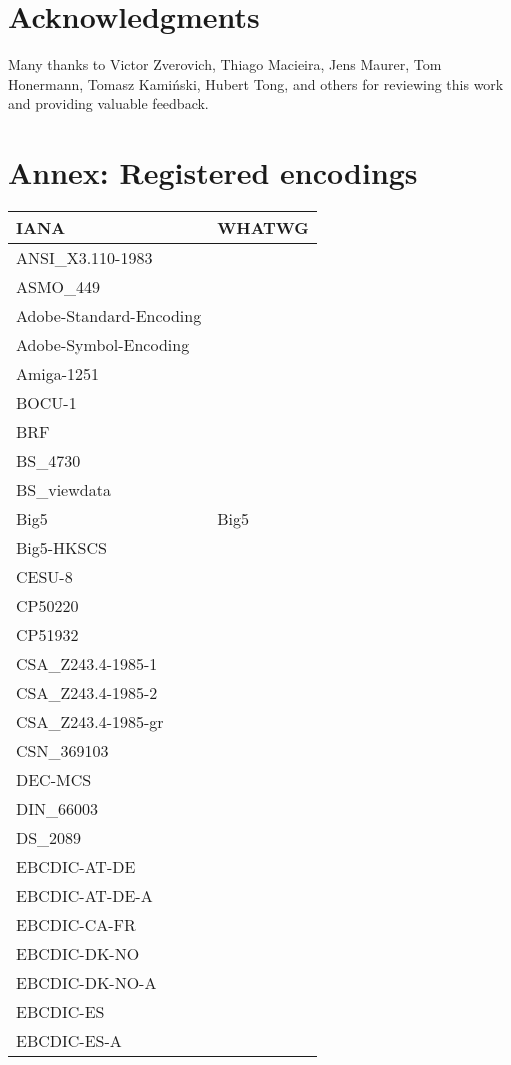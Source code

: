 \documentclass{wg21}
\begin{document}
\section{Acknowledgments}

Many thanks to Victor Zverovich, Thiago Macieira, Jens Maurer, Tom Honermann, Tomasz Kamiński, Hubert Tong,  and others for reviewing this work and providing valuable feedback.


\section{Annex: Registered encodings}
\begin{longtable}{| p{} | p{} |}
\hline
\textbf{IANA} & \textbf{WHATWG} \\ \hline
\hline
ANSI_X3.110-1983 & \\ \hline
ASMO_449 & \\ \hline
Adobe-Standard-Encoding & \\ \hline
Adobe-Symbol-Encoding & \\ \hline
Amiga-1251 & \\ \hline
BOCU-1 & \\ \hline
BRF & \\ \hline
BS_4730 & \\ \hline
BS_viewdata & \\ \hline
Big5 & Big5\\ \hline
Big5-HKSCS & \\ \hline
CESU-8 & \\ \hline
CP50220 & \\ \hline
CP51932 & \\ \hline
CSA_Z243.4-1985-1 & \\ \hline
CSA_Z243.4-1985-2 & \\ \hline
CSA_Z243.4-1985-gr & \\ \hline
CSN_369103 & \\ \hline
DEC-MCS & \\ \hline
DIN_66003 & \\ \hline
DS_2089 & \\ \hline
EBCDIC-AT-DE & \\ \hline
EBCDIC-AT-DE-A & \\ \hline
EBCDIC-CA-FR & \\ \hline
EBCDIC-DK-NO & \\ \hline
EBCDIC-DK-NO-A & \\ \hline
EBCDIC-ES & \\ \hline
EBCDIC-ES-A & \\ \hline

\end{longtable}
\end{document}

